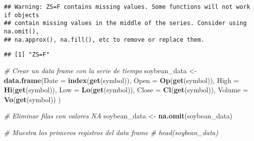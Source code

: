 \documentclass[
]{book}
\newenvironment{Shaded}{\begin{snugshade}}{\end{snugshade}}
\newcommand{\AttributeTok}[1]{\textcolor[rgb]{0.13,0.29,0.53}{#1}}
\newcommand{\CommentTok}[1]{\textcolor[rgb]{0.56,0.35,0.01}{\textit{#1}}}
\newcommand{\DecValTok}[1]{\textcolor[rgb]{0.00,0.00,0.81}{#1}}
\newcommand{\FunctionTok}[1]{\textcolor[rgb]{0.13,0.29,0.53}{\textbf{#1}}}
\newcommand{\NormalTok}[1]{#1}
\newcommand{\OtherTok}[1]{\textcolor[rgb]{0.56,0.35,0.01}{#1}}
\newcommand{\SpecialCharTok}[1]{\textcolor[rgb]{0.81,0.36,0.00}{\textbf{#1}}}
\begin{document}
\begin{verbatim}
## Warning: ZS=F contains missing values. Some functions will not work if objects
## contain missing values in the middle of the series. Consider using na.omit(),
## na.approx(), na.fill(), etc to remove or replace them.
\end{verbatim}

\begin{verbatim}
## [1] "ZS=F"
\end{verbatim}

\begin{Shaded}
\begin{Highlighting}[]
\CommentTok{\# Crear un data frame con la serie de tiempo}
\NormalTok{soybean\_data }\OtherTok{\textless{}{-}} \FunctionTok{data.frame}\NormalTok{(}\AttributeTok{Date =} \FunctionTok{index}\NormalTok{(}\FunctionTok{get}\NormalTok{(symbol)), }
                           \AttributeTok{Open =} \FunctionTok{Op}\NormalTok{(}\FunctionTok{get}\NormalTok{(symbol)),}
                           \AttributeTok{High =} \FunctionTok{Hi}\NormalTok{(}\FunctionTok{get}\NormalTok{(symbol)),}
                           \AttributeTok{Low =} \FunctionTok{Lo}\NormalTok{(}\FunctionTok{get}\NormalTok{(symbol)),}
                           \AttributeTok{Close =} \FunctionTok{Cl}\NormalTok{(}\FunctionTok{get}\NormalTok{(symbol)),}
                           \AttributeTok{Volume =} \FunctionTok{Vo}\NormalTok{(}\FunctionTok{get}\NormalTok{(symbol))}
\NormalTok{                           )}

\CommentTok{\# Eliminar filas con valores NA}
\NormalTok{soybean\_data }\OtherTok{\textless{}{-}} \FunctionTok{na.omit}\NormalTok{(soybean\_data)}

\CommentTok{\# Muestra los primeros registros del data frame}
\CommentTok{\# head(soybean\_data)}
\end{Highlighting}
\end{Shaded}

\begin{Shaded}
\end{Shaded}
\end{document}
